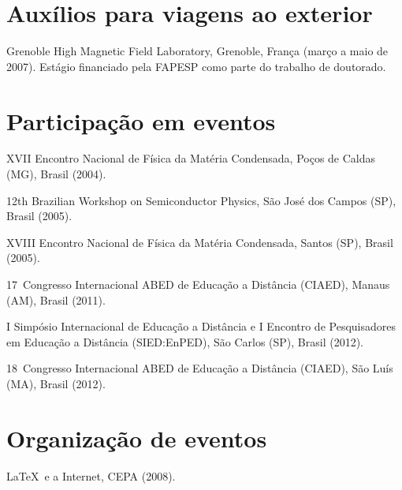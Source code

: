 \section*{Auxílios para viagens ao exterior}

\begin{compactitem}
	\item Grenoble High Magnetic Field Laboratory, Grenoble, França (março a maio de 2007). Estágio financiado pela FAPESP como parte do trabalho de doutorado.
\end{compactitem}


\section*{Participação em eventos}

\begin{compactitem}
	\item XVII Encontro Nacional de Física da Matéria Condensada, Poços de Caldas (MG), Brasil (2004).
	\item 12th Brazilian Workshop on Semiconductor Physics, São José dos Campos (SP), Brasil (2005).
	\item XVIII Encontro Nacional de Física da Matéria Condensada, Santos (SP), Brasil (2005).
	\item 17\textordmasculine\ Congresso Internacional ABED de Educação a Distância (CIAED), Manaus (AM), Brasil (2011).
	\item I Simpósio Internacional de Educação a Distância e I Encontro de Pesquisadores em Educação a Distância (SIED:EnPED), São Carlos (SP), Brasil (2012).
	\item 18\textordmasculine\ Congresso Internacional ABED de Educação a Distância (CIAED), São Luís (MA), Brasil (2012).
\end{compactitem}

\section*{Organização de eventos}

\begin{compactitem}
	\item \LaTeX\ e a Internet, CEPA (2008).
\end{compactitem}

